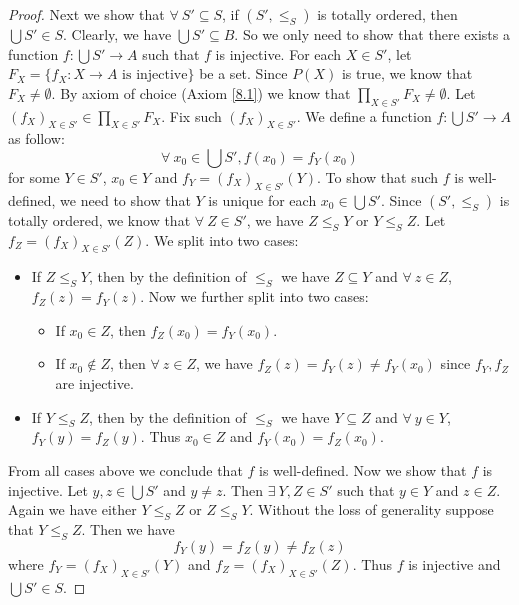 \begin{proof}
    Next we show that \(\forall\ S' \subseteq S\), if \((S', \leq_S)\) is totally ordered, then \(\bigcup S' \in S\).
    Clearly, we have \(\bigcup S' \subseteq B\).
    So we only need to show that there exists a function \(f : \bigcup S' \to A\) such that \(f\) is injective.
    For each \(X \in S'\), let \(F_X = \{f_X : X \to A \text{ is injective}\}\) be a set.
    Since \(P(X)\) is true, we know that \(F_X \neq \emptyset\).
    By axiom of choice (Axiom \ref{8.1}) we know that \(\prod_{X \in S'} F_X \neq \emptyset\).
    Let \((f_X)_{X \in S'} \in \prod_{X \in S'} F_X\).
    Fix such \((f_X)_{X \in S'}\).
    We define a function \(f : \bigcup S' \to A\) as follow:
    \[
        \forall\ x_0 \in \bigcup S', f(x_0) = f_Y(x_0)
    \]
    for some \(Y \in S'\), \(x_0 \in Y\) and \(f_Y = (f_X)_{X \in S'}(Y)\).
    To show that such \(f\) is well-defined, we need to show that \(Y\) is unique for each \(x_0 \in \bigcup S'\).
    Since \((S', \leq_S)\) is totally ordered, we know that \(\forall\ Z \in S'\), we have \(Z \leq_S Y\) or \(Y \leq_S Z\).
    Let \(f_Z = (f_X)_{X \in S'}(Z)\).
    We split into two cases:
    \begin{itemize}
        \item If \(Z \leq_S Y\), then by the definition of \(\leq_S\) we have \(Z \subseteq Y\) and \(\forall\ z \in Z\), \(f_Z(z) = f_Y(z)\).
              Now we further split into two cases:
              \begin{itemize}
                  \item If \(x_0 \in Z\), then \(f_Z(x_0) = f_Y(x_0)\).
                  \item If \(x_0 \notin Z\), then \(\forall\ z \in Z\), we have \(f_Z(z) = f_Y(z) \neq f_Y(x_0)\) since \(f_Y, f_Z\) are injective.
              \end{itemize}
        \item If \(Y \leq_S Z\), then by the definition of \(\leq_S\) we have \(Y \subseteq Z\) and \(\forall\ y \in Y\), \(f_Y(y) = f_Z(y)\).
              Thus \(x_0 \in Z\) and \(f_Y(x_0) = f_Z(x_0)\).
    \end{itemize}
    From all cases above we conclude that \(f\) is well-defined.
    Now we show that \(f\) is injective.
    Let \(y, z \in \bigcup S'\) and \(y \neq z\).
    Then \(\exists\ Y, Z \in S'\) such that \(y \in Y\) and \(z \in Z\).
    Again we have either \(Y \leq_S Z\) or \(Z \leq_S Y\).
    Without the loss of generality suppose that \(Y \leq_S Z\).
    Then we have
    \[
        f_Y(y) = f_Z(y) \neq f_Z(z)
    \]
    where \(f_Y = (f_X)_{X \in S'}(Y)\) and \(f_Z = (f_X)_{X \in S'}(Z)\).
    Thus \(f\) is injective and \(\bigcup S' \in S\).


\end{proof}
